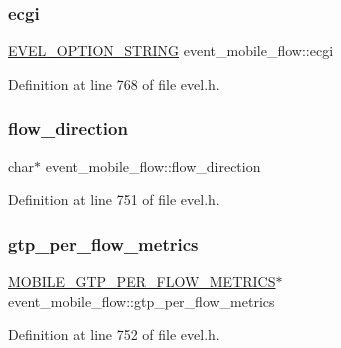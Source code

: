 \subsubsection{\texorpdfstring{ecgi}{ecgi}}
{\footnotesize\ttfamily \hyperlink{evel_8h_a0de5113a7b72de93c0c7b644f7ea7ec3}{E\+V\+E\+L\+\_\+\+O\+P\+T\+I\+O\+N\+\_\+\+S\+T\+R\+I\+NG} event\+\_\+mobile\+\_\+flow\+::ecgi}



Definition at line 768 of file evel.\+h.

\hypertarget{structevent__mobile__flow_a472089128d0ed271f48da03b12ea1135}{}\label{structevent__mobile__flow_a472089128d0ed271f48da03b12ea1135} 
\subsubsection{\texorpdfstring{flow\+\_\+direction}{flow\_direction}}
{\footnotesize\ttfamily char$\ast$ event\+\_\+mobile\+\_\+flow\+::flow\+\_\+direction}



Definition at line 751 of file evel.\+h.

\hypertarget{structevent__mobile__flow_ab3248c7c5ccc0a61e2e2156ac096590d}{}\label{structevent__mobile__flow_ab3248c7c5ccc0a61e2e2156ac096590d} 
\subsubsection{\texorpdfstring{gtp\+\_\+per\+\_\+flow\+\_\+metrics}{gtp\_per\_flow\_metrics}}
{\footnotesize\ttfamily \hyperlink{evel_8h_aab323a610a0d9f5df6ebb82f7e060494}{M\+O\+B\+I\+L\+E\+\_\+\+G\+T\+P\+\_\+\+P\+E\+R\+\_\+\+F\+L\+O\+W\+\_\+\+M\+E\+T\+R\+I\+CS}$\ast$ event\+\_\+mobile\+\_\+flow\+::gtp\+\_\+per\+\_\+flow\+\_\+metrics}



Definition at line 752 of file evel.\+h.

\hypertarget{structevent__mobile__flow_ab3e65773132fa368adbaccdef4fc1b81}{}\label{structevent__mobile__flow_ab3e65773132fa368adbaccdef4fc1b81} 
